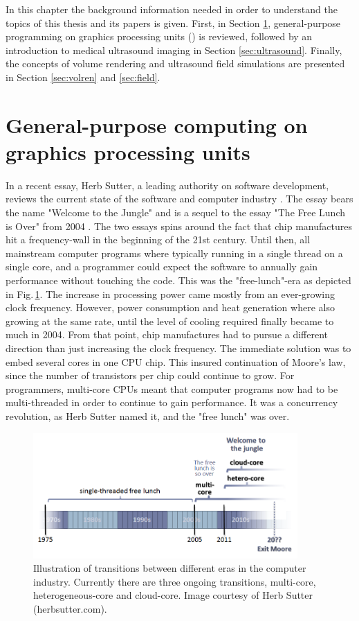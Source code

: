 %

In this chapter the background information needed in order to understand the topics of this thesis and its papers is given. First, in Section \ref{sec:gpgpu}, general-purpose programming on graphics processing units () is reviewed, followed by an introduction to medical ultrasound imaging in Section \ref{sec:ultrasound}. Finally, the concepts of volume rendering and ultrasound field simulations are presented in Section \ref{sec:volren} and \ref{sec:field}.

\section{General-purpose computing on graphics processing units}\label{sec:gpgpu}
In a recent essay, Herb Sutter, a leading authority on software development, reviews the current state of the software and computer industry \cite{HerbSutter}. The essay bears the name "Welcome to the Jungle" and is a sequel to the essay "The Free Lunch is Over" from 2004 \cite{HerbSuttera}. The two essays spins around the fact that chip manufactures hit a frequency-wall in the beginning of the 21st century. Until then, all mainstream computer programs where typically running in a single thread on a single core, and a programmer could expect the software to annually gain performance without touching the code. This was the "free-lunch"-era as depicted in Fig.\,\ref{fig:jungle}. The increase in processing power came mostly from an ever-growing clock frequency. However, power consumption and heat generation where also growing at the same rate, until the level of cooling required finally became to much in 2004.  From that point, chip manufactures had to pursue a different direction  than just increasing the clock frequency. The immediate solution was to embed several cores in one CPU chip. This insured continuation of Moore's law, since the number of transistors per chip could continue to grow. For programmers, multi-core CPUs meant that computer programs now had to be multi-threaded in order to continue to gain performance. It was a concurrency revolution, as Herb Sutter named it, and  the "free lunch" was over.

\begin{figure}
\centering
\includegraphics[width=0.9\textwidth]{img/free_lunsh.png}
\caption{Illustration of transitions between different eras in the computer industry. Currently there are three ongoing transitions, multi-core, heterogeneous-core and cloud-core. Image courtesy of Herb Sutter (herbsutter.com).}
\label{fig:jungle}
\end{figure}

